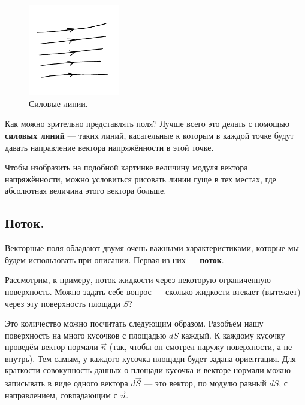 \documentclass[11pt,a4paper]{article}
\numberwithin{equation}{section}
\begin{document}
\begin{figure}
  \vspace{-1cm}
  \begin{center}
  \includegraphics[width=4cm]{lines.pdf}  
  \end{center}
  \vspace{-1cm}
  \caption{Силовые линии.}
  \label{fig:force_lines}
  \vspace{-1.1cm}
\end{figure}

Как можно зрительно представлять поля? Лучше всего это делать с
помощью \textbf{силовых линий} --- таких линий, касательные к которым в
каждой точке будут давать направление вектора напряжённости в этой
точке. 

Чтобы изобразить на подобной картинке величину модуля вектора
напряжённости, можно условиться рисовать линии гуще в тех местах, где
абсолютная величина этого вектора больше. 
\subsection{Поток.}
\label{sec:flux}

Векторные поля обладают двумя очень важными характеристиками, которые
мы будем использовать при описании. Первая из них --- \textbf{поток}. 

Рассмотрим, к примеру, поток жидкости через некоторую ограниченную
поверхность. Можно задать себе вопрос --- сколько жидкости втекает
(вытекает) через эту поверхность площади $S$? 

Это количество можно посчитать следующим образом. Разобъём нашу
поверхность на много кусочков с площадью $dS$ каждый. К каждому
кусочку проведём вектор нормали $\vec{n}$ (так, чтобы он смотрел
наружу поверхности, а не внутрь). Тем самым, у каждого кусочка площади
будет задана ориентация. Для краткости совокупность данных о площади
кусочка и векторе нормали можно записывать в виде одного вектора
$d\vec{S}$ --- это вектор, по модулю равный $dS$, с направлением,
совпадающим с $\vec{n}$.
\end{document}
